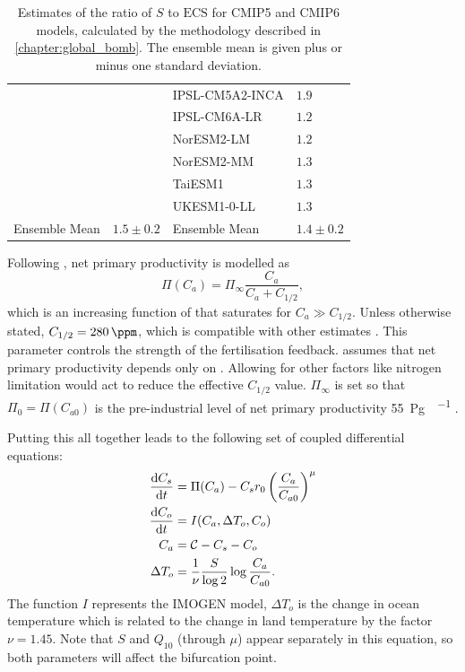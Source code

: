\begin{table}
\begin{tabular}{llll}
                        &                  & IPSL-CM5A2-INCA & $1.9$               \\
                        &                  & IPSL-CM6A-LR    & $1.2$               \\
                        &                  & NorESM2-LM      & $1.2$               \\
                        &                  & NorESM2-MM      & $1.3$               \\
                        &                  & TaiESM1         & $1.3$               \\
                        &                  & UKESM1-0-LL     & $1.3$               \\
     Ensemble Mean      & $1.5 \pm 0.2$    & Ensemble Mean   & $1.4\pm0.2$         \\
     \bottomrule
   \end{tabular}
\caption[Estimates of $S/\mathrm{ECS}$ for CMIP models]{Estimates of the ratio of $S$ to $\mathrm{ECS}$ for CMIP5 and CMIP6 models, calculated by the methodology described in \cref{chapter:global_bomb}.
  The ensemble mean is given plus or minus one standard deviation.}
\label{tab:S_vs_ECS}
\end{table}

Following \cite{Cox2006}, net primary productivity is modelled as
\begin{equation}
  \label{eq:npp}
  \Pi(C_a) = \Pi_{\infty}\frac{C_a}{C_a + C_{1/2}},
\end{equation}
which is an increasing function of  that saturates for $C_a \gg C_{1/2}$. Unless otherwise stated, $C_{1/2} = \SI{280}{\ppm}$, which is compatible with other estimates
\parencite{KolbySmith2016,Wenzel2016}. This parameter controls the strength of the  fertilisation feedback.  assumes that net primary productivity depends only
on . Allowing for other factors like nitrogen limitation would act to reduce the effective $C_{1/2}$ value. $\Pi_{\infty}$ is set so that $\Pi_0 = \Pi(C_{a0})$ is the pre-industrial
level of net primary productivity \SI{55}{\peta\gram\carbon\per\year} \parencite{Lade2018}.

Putting this all together leads to the following set of coupled differential equations:
\begin{subequations}
  \label{eq:imogen_deterministic}
  \begin{align}
    \dv{C_s}{t}     &= \Pi(C_a) - C_s r_0 \left(\frac{C_a}{C_{a0}}\right)^\mu \\
    \dv{C_o}{t}     &= I(C_a,\Delta T_o,C_o) \\
    C_a             &= \mathcal{C} - C_s - C_o \\
    \Delta T_o             &= \frac{1}{\nu}\frac{S}{\log 2}\log \frac{C_a}{C_{a0}}.
  \end{align}
\end{subequations}
The function $I$ represents the IMOGEN model, $\Delta T_o$ is the change in ocean temperature which is related to the change in land temperature by the
factor $\nu = 1.45$. Note that $S$ and $Q_{10}$ (through $\mu$) appear separately in this equation, so both parameters will affect the bifurcation point.

